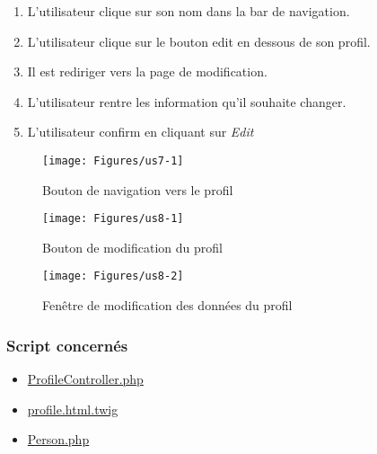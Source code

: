 \begin{enumerate}
	\item L'utilisateur clique sur son nom dans la bar de navigation.
	\item L'utilisateur clique sur le bouton edit en dessous de son profil. 
	\item Il est rediriger vers la page de modification. 
	\item L'utilisateur rentre les information qu'il souhaite changer. 
	\item L'utilisateur confirm en cliquant sur \textit{Edit}
\end{enumerate}

\vspace{\baselineskip}
\begin{figure}[h]
	\texttt{[image: Figures/us7-1]}
	\caption{Bouton de navigation vers le profil}
\end{figure}

\vspace{\baselineskip}
\begin{figure}[h]
	\texttt{[image: Figures/us8-1]}
	\caption{Bouton de modification du profil}
\end{figure}

\newpage
\begin{figure}[h]
	\texttt{[image: Figures/us8-2]}
	\caption{Fenêtre de modification des données du profil}
\end{figure}

\vspace{\baselineskip}
\subsubsection{Script concernés}
	\begin{itemize}
		\item \href{https://github.com/victorsmits/Aquabike/blob/master/backend/src/Controller/ProfileController.php}{ProfileController.php}
		\item \href{https://github.com/victorsmits/Aquabike/blob/master/backend/templates/registration/profile.html.twig}{profile.html.twig}
		\item \href{https://github.com/victorsmits/Aquabike/blob/master/backend/src/Entity/Person.php}{Person.php}
	\end{itemize}